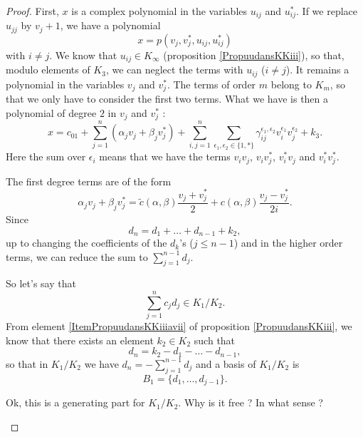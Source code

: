 \begin{proof}
    First, $x$ is a complex polynomial in the variables $u_{ij}$ and $u_{ij}^*$. If we replace $u_{jj}$ by $v_j+1$, we have a polynomial
    \begin{equation}
        x=p(v_j,v_j^*,u_{ij},u_{ij}^*)
    \end{equation}
    with $i\neq j$. We know that $u_{ij}\in K_{\infty}$ (proposition \ref{PropuudansKKiii}), so that, modulo elements of $K_3$, we can neglect the terms with $u_{ij}$ ($i\neq j$). It remains a polynomial in the variables $v_j$ and $v_j^*$. The terms of order $m$ belong to $K_m$, so that we only have to consider the first two terms. What we have is then a polynomial of degree $2$ in $v_j$ and $v_j^*$ :
    \begin{equation}        \label{EqxSumvvdgammaUn}
        x=c_01+\sum_{j=1}^n(\alpha_jv_j+\beta_jv_j^*)+\sum_{i,j=1}^n\sum_{\epsilon_1,\epsilon_2\in\{ 1,* \}}\gamma_{ij}^{\epsilon_1,\epsilon_2}v_i^{\epsilon_1}v_j^{\epsilon_2}+k_3.
    \end{equation}
    Here the sum over $\epsilon_i$ means that we have the terms $v_iv_j$, $v_iv_j^*$, $v_i^*v_j$ and $v_i^*v_j^*$.

    The first degree terms are of the form
    \begin{equation}
        \alpha_j v_j+\beta_jv^*_j=\tilde c(\alpha,\beta)\frac{ v_j+v_j^* }{ 2 }+c(\alpha,\beta)\frac{ v_j-v_j^* }{ 2i }.
    \end{equation}
    Since
    \begin{equation}
        d_n=d_1+\ldots+d_{n-1}+k_2,
    \end{equation}
    up to changing the coefficients of the $d_k$'s ($j\leq n-1$) and in the higher order terms, we can reduce the sum to $\sum_{j=1}^{n-1}d_j$.


    So let's say that
    \begin{equation}
        \sum_{j=1}^n c_jd_j\in K_1/K_2.
    \end{equation}
    From element \ref{ItemPropuudansKKiiiavii} of proposition \ref{PropuudansKKiii}, we know that there exists an element $k_2\in K_2$ such that
    \begin{equation}
        d_n=k_2-d_1-\ldots -d_{n-1},
    \end{equation}
    so that in $K_1/K_2$ we have $d_n=-\sum_{j=1}^{n-1}d_j$ and a basis of $K_1/K_2$ is
    \begin{equation}
        B_1=\{ d_1,\ldots,d_{j-1} \}.
    \end{equation}
    \begin{probleme}
        Ok, this is a generating part for $K_1/K_2$. Why is it free ? In what sense ?
    \end{probleme}
    

\end{proof}
